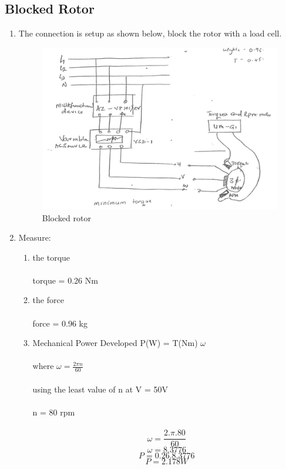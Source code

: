 \documentclass[12pt,a4paper]{report}
\begin{document}
\subsection{Blocked Rotor}
\begin{enumerate}
    \item The connection is setup as shown below, block the rotor with a load cell.
    \begin{figure}[H]
        \centering
        \includegraphics[width=0.8\linewidth]{figure_6_6.jpeg}
        \caption{Blocked rotor}
        \label{fig_6}
    \end{figure}
    \item Measure:
    \begin{enumerate}[label=\roman*.]
        \item the torque\\
        \\
        torque = 0.26 Nm
        \item the force\\
        \\
        force = 0.96 kg
        \item Mechanical Power Developed 
         P(W) = T(Nm) $\omega$\\
         \\
         where $\omega = \frac{2 \pi n}{60}$\\
         \\
         using the least value of n at V = 50V\\
         \\
         n = 80 rpm\\
         \\
         $$\omega = \frac{2 . \pi . 80 }{60}$$
         $$\omega = 8.3776$$
         $$P = 0.26 . 8.3776$$
         $$P = 2.178W$$
         
    \end{enumerate}
\end{enumerate}
\end{document}
